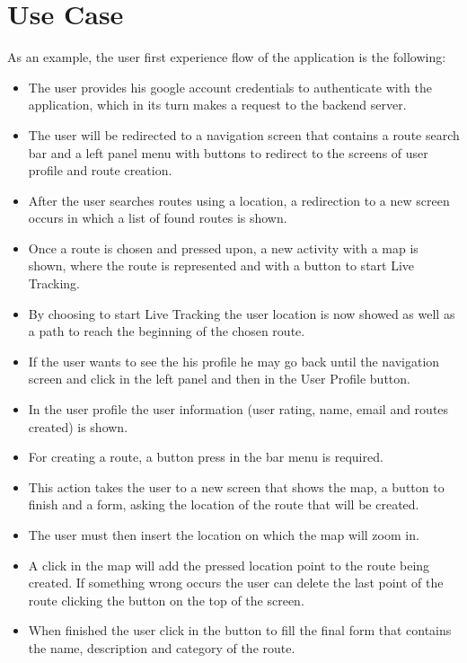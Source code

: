 \section*{Use Case}
As an example, the user first experience flow of the application is the following:
        \begin{itemize}
                \item The user provides his google account credentials to authenticate with the application, which in its turn makes a request to the backend server.
                \item The user will be redirected to a navigation screen that contains a route search bar and a left panel menu with buttons to redirect to the screens of user profile and route creation.
                \item After the user searches routes using a location, a redirection to a new screen occurs in which a list of found routes is shown.
                \item Once a route is chosen and pressed upon, a new activity with a map is shown, where the route is represented and with a button to start Live Tracking.
                \item By choosing to start Live Tracking the user location is now showed as well as a path to reach the beginning of the chosen route.
                \item If the user wants to see the his profile he may go back until the navigation screen and click in the left panel and then in the User Profile button.
                \item In the user profile the user information (user rating, name, email and routes created) is shown.
                \item For creating a route, a button press in the bar menu is required.
                \item This action takes the user to a new screen that shows the map, a button to finish and a form, asking the location of the route that will be created.
                \item The user must then insert the location on which the map will zoom in.
                \item A click in the map will add the pressed location point to the route being created. If something wrong occurs the user can delete the last point of the route clicking the button on the top of the screen.
                \item When finished the user click in the button to fill the final form that contains the name, description and category of the route.
        \end{itemize}